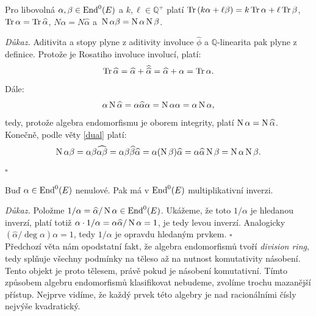 \documentclass[12pt]{report}
\begin{document}
\begin{veta}
Pro libovolná $\alpha,\beta \in \operatorname{End}^0 (E)$ a $k, \ell \in \mathbb{Q}^{+}$ platí $\operatorname{Tr} \left( k\alpha + \ell \beta \right) = k\operatorname{Tr} \alpha + \ell\operatorname{Tr} \beta$, $\operatorname{Tr} \alpha = \operatorname{Tr} \widehat{\alpha}$, $N \alpha = N \widehat{\alpha}$ a~$\operatorname{N} \alpha \beta = \operatorname{N} \alpha \operatorname{N} \beta$.
\end{veta}
\noindent \textit{Důkaz.} Aditivita a stopy plyne z aditivity involuce $\widehat{\phi}$ a $\mathbb{Q}$-linearita pak plyne z definice. Protože je Rosatiho involuce involucí, platí:
\begin{equation*}
\operatorname{Tr} \widehat{\alpha} = \widehat{\alpha} + \widehat{\widehat{\alpha}} = \widehat{\alpha} + \alpha = \operatorname{Tr} \alpha.
\end{equation*}
Dále:
\begin{equation*}
\alpha \operatorname{N} \widehat{\alpha} = \alpha \widehat{\alpha} \alpha = \operatorname{N} \alpha \alpha = \alpha \operatorname{N} \alpha,
\end{equation*} tedy, protože algebra endomorfismu je oborem integrity, platí $\operatorname{N} \alpha = \operatorname{N} \widehat{\alpha}$. Konečně, podle věty \ref{dual} platí:
\begin{equation*}
\operatorname{N} \alpha \beta = \alpha \beta \widehat{\alpha \beta} = \alpha \beta \widehat{\beta} \widehat{\alpha} = \alpha (\operatorname{N} \beta) \widehat{\alpha} = \alpha \widehat{\alpha} \operatorname{N} \beta = \operatorname{N} \alpha \operatorname{N} \beta.
\end{equation*}
\hfill $\square$\\


\begin{dusledek}
Buď $\alpha \in \operatorname{End}^0 (E)$ nenulové. Pak má v $\operatorname{End}^0 (E)$ multiplikativní inverzi.
\end{dusledek}
\noindent \textit{Důkaz.} Položme $1/\alpha = \widehat{\alpha}/\operatorname{N} \alpha \in \operatorname{End}^0 (E)$. Ukážeme, že toto $1/\alpha$ je hledanou inverzí, platí totiž $\alpha \cdot 1/ \alpha = \alpha \widehat{\alpha} /\operatorname{N} \alpha = 1$, je tedy levou inverzí. Analogicky $(\widehat{\alpha}/\deg \alpha) \alpha =  1$, tedy $1/\alpha$ je opravdu hledaným prvkem. \hfill $\square$\\

Předchozí věta nám opodstatní fakt, že algebra endomorfismů tvoří \textit{division ring}, tedy splňuje všechny podmínky na těleso až na nutnost komutativity násobení. Tento objekt je proto tělesem, právě pokud je násobení komutativní. Tímto způsobem algebru endomorfismů klasifikovat nebudeme, zvolíme trochu mazanější přístup. Nejprve vidíme, že každý prvek této algebry je nad racionálními čísly nejvýše kvadratický.\\
\end{document}
